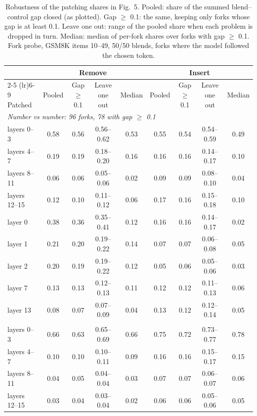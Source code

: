 \begin{table}[t]
\centering
\small
\caption{Robustness of the patching shares in Fig.~5. Pooled: share of the summed blend--control gap closed (as plotted). Gap $\geq$ 0.1: the same, keeping only forks whose gap is at least 0.1. Leave one out: range of the pooled share when each problem is dropped in turn. Median: median of per-fork shares over forks with gap $\geq$ 0.1. Fork probe, GSM8K items 10--49, 50/50 blends, forks where the model followed the chosen token.}
\label{tab:fig5-robust}
\begin{tabular}{lcccccccc}
\toprule
 & \multicolumn{4}{c}{Remove} & \multicolumn{4}{c}{Insert} \\
\cmidrule(lr){2-5} \cmidrule(lr){6-9}
Patched & Pooled & Gap $\geq$ 0.1 & Leave one out & Median & Pooled & Gap $\geq$ 0.1 & Leave one out & Median \\
\midrule
\multicolumn{9}{l}{\emph{Number vs number: 96 forks, 78 with gap $\geq$ 0.1}} \\
layers 0--3 & 0.58 & 0.56 & 0.56--0.62 & 0.53 & 0.55 & 0.54 & 0.54--0.59 & 0.49 \\
layers 4--7 & 0.19 & 0.19 & 0.18--0.20 & 0.16 & 0.16 & 0.16 & 0.14--0.17 & 0.10 \\
layers 8--11 & 0.06 & 0.06 & 0.05--0.06 & 0.02 & 0.09 & 0.09 & 0.08--0.10 & 0.04 \\
layers 12--15 & 0.12 & 0.10 & 0.11--0.12 & 0.06 & 0.17 & 0.16 & 0.15--0.18 & 0.10 \\
layer 0 & 0.38 & 0.36 & 0.35--0.41 & 0.12 & 0.16 & 0.16 & 0.14--0.17 & 0.02 \\
layer 1 & 0.21 & 0.20 & 0.19--0.22 & 0.14 & 0.07 & 0.07 & 0.06--0.08 & 0.05 \\
layer 2 & 0.20 & 0.19 & 0.19--0.22 & 0.12 & 0.05 & 0.06 & 0.05--0.06 & 0.03 \\
layer 7 & 0.13 & 0.13 & 0.12--0.13 & 0.11 & 0.12 & 0.12 & 0.11--0.13 & 0.06 \\
layer 13 & 0.08 & 0.07 & 0.07--0.09 & 0.04 & 0.13 & 0.12 & 0.12--0.14 & 0.05 \\
\addlinespace
\multicolumn{9}{l}{\emph{Word vs word: 139 forks, 108 with gap $\geq$ 0.1}} \\
layers 0--3 & 0.66 & 0.63 & 0.65--0.69 & 0.66 & 0.75 & 0.72 & 0.73--0.77 & 0.78 \\
layers 4--7 & 0.10 & 0.10 & 0.10--0.11 & 0.09 & 0.16 & 0.16 & 0.15--0.17 & 0.15 \\
layers 8--11 & 0.04 & 0.05 & 0.04--0.04 & 0.03 & 0.07 & 0.07 & 0.06--0.07 & 0.06 \\
layers 12--15 & 0.03 & 0.04 & 0.03--0.04 & 0.02 & 0.06 & 0.06 & 0.05--0.06 & 0.05 \\
\bottomrule
\end{tabular}
\end{table}
